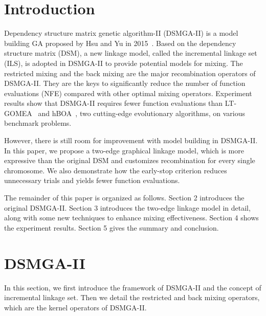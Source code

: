 \documentclass{sig-alternate-05-2015}
\begin{document}

\section{Introduction}

Dependency structure matrix genetic algorithm-II (DSMGA-II) is a model building GA proposed by Hsu and Yu in 2015~\cite{hsu:DSMGA2}.
Based on the dependency structure matrix (DSM), a new linkage model, called the incremental linkage set (ILS), is adopted in DSMGA-II to provide potential models for mixing. The restricted mixing and the back mixing are the major recombination operators of DSMGA-II. They are the keys to significantly reduce the number of function evaluations (NFE) compared with other optimal mixing operators. Experiment results show that DSMGA-II requires fewer function evaluations  than  LT-GOMEA~\cite{bosman:LT-GOMEA} and hBOA~\cite{pelikan:hBOA}, two cutting-edge evolutionary algorithms, on various benchmark problems. 

However, there is still room for improvement with model building in DSMGA-II. In this paper, we propose a two-edge graphical linkage model, which is more expressive than the original DSM and customizes recombination for every single chromosome. We also demonstrate how the early-stop criterion reduces unnecessary trials and yields fewer function evaluations.


The remainder of this paper is organized as follows. Section 2 introduces the original DSMGA-II. Section 3 introduces the two-edge linkage model in detail, along with some new techniques to enhance mixing effectiveness. Section 4 shows the experiment results. Section 5 gives the summary and conclusion.



\section{DSMGA-II}
In this section, we first introduce the framework of DSMGA-II and the concept of incremental linkage set. Then we detail the restricted and back mixing operators, which are the kernel operators of DSMGA-II.
\end{document}
